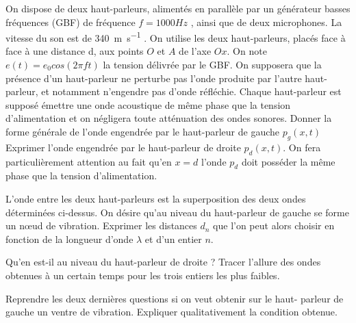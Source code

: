 \begin{Exercise}[title=Onde sonore stationnaires]
  On dispose de deux haut-parleurs, alimentés en parallèle par un générateur
  basses fréquences (GBF) de fréquence $f = 1000 Hz$ , ainsi que de deux
  microphones. La vitesse du son est de \SI{340}{\m\per\s} . On utilise les deux
  haut-parleurs, placés face à face à une distance d, aux points $O$ et $A$ de l’axe
  $Ox$. On note $e(t) = e_0 cos (2\pi ft)$ la tension délivrée par le GBF. On supposera
  que la présence d’un haut-parleur ne perturbe pas l’onde produite par l’autre
  haut-parleur, et notamment n’engendre pas d’onde réfléchie. Chaque
  haut-parleur est supposé émettre une onde acoustique de même phase que la
  tension d’alimentation et on négligera toute atténuation des ondes sonores.
  \Question Donner la forme générale de l’onde engendrée par le haut-parleur de
  gauche $p_g(x, t)$
  \Question Exprimer l’onde engendrée par le haut-parleur de droite $p_d(x, t)$.
  On fera particulièrement attention au fait qu’en $x = d$ l’onde $p_d$ doit
  posséder la même phase que la tension d’alimentation.

  \Question L’onde entre les deux haut-parleurs est la superposition des deux
  ondes déterminées ci-dessus. On désire qu’au niveau du haut-parleur de gauche
  se forme un nœud de vibration. Exprimer les distances $d_n$ que l’on peut
  alors choisir en fonction de la longueur d’onde $\lambda$ et d’un entier $n$.

  \Question Qu’en est-il au niveau du haut-parleur de droite ? Tracer l’allure des
  ondes obtenues à un certain temps pour les trois entiers les plus faibles.

  \Question Reprendre les deux dernières questions si on veut obtenir sur le
  haut- parleur de gauche un ventre de vibration. Expliquer qualitativement la
  condition obtenue.
\end{Exercise}

